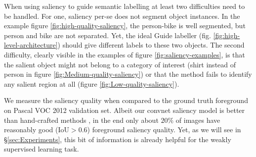 \documentclass[british,10pt,twocolumn,letterpaper]{article}
\begin{document}
When using saliency to guide semantic labelling at least two difficulties
need to be handled. For one, saliency per-se does not segment object
instances. In the example figure \ref{fig:high-quality-saliency},
the person-bike is well segmented, but person and bike are not separated.
Yet, the ideal Guide labeller (fig. \ref{fig:high-level-architecture})
should give different labels to these two objects. The second difficulty,
clearly visible in the examples of figure \ref{fig:saliency-examples},
is that the salient object might not belong to a category of interest
(shirt instead of person in figure \ref{fig:Medium-quality-saliency})
or that the method fails to identify any salient region at all (figure
\ref{fig:Low-quality-saliency}). 

We measure the saliency quality when compared to the ground truth
foreground on Pascal VOC 2012 validation\emph{ }set. Albeit our convnet
saliency model is better than hand-crafted methods \cite{Jiang2013Cvpr,zhang2015MBD},
in the end only about $20\%$ of images have reasonably good ($\text{IoU}>0.6$)
foreground saliency quality. Yet, as we will see in \S \ref{sec:Experiments},
this bit of information is already helpful for the weakly supervised
learning task. 
\end{document}
